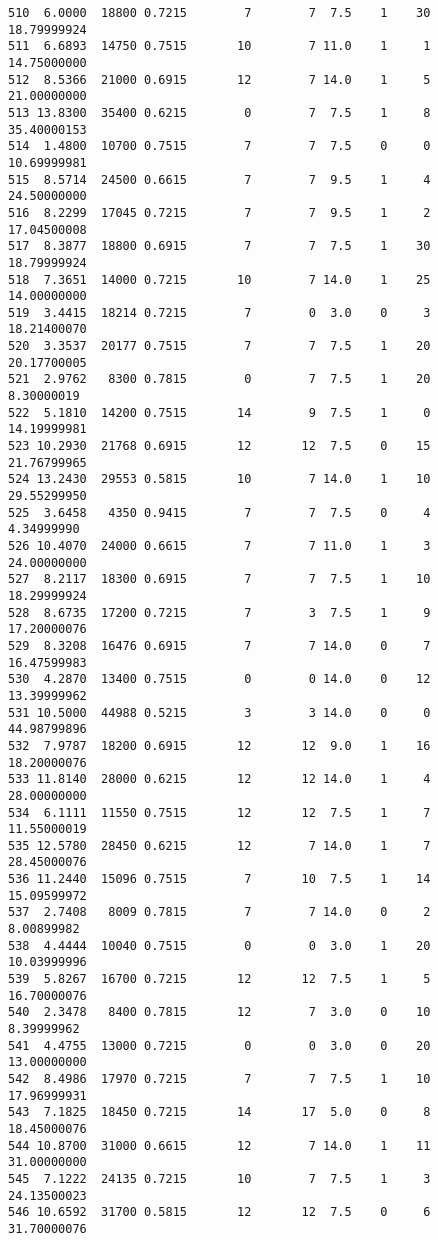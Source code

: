 \documentclass[
  letterpaper,
  DIV=11,
  numbers=noendperiod]{scrreprt}
\begin{document}
\begin{verbatim}
510  6.0000  18800 0.7215        7        7  7.5    1    30 18.79999924
511  6.6893  14750 0.7515       10        7 11.0    1     1 14.75000000
512  8.5366  21000 0.6915       12        7 14.0    1     5 21.00000000
513 13.8300  35400 0.6215        0        7  7.5    1     8 35.40000153
514  1.4800  10700 0.7515        7        7  7.5    0     0 10.69999981
515  8.5714  24500 0.6615        7        7  9.5    1     4 24.50000000
516  8.2299  17045 0.7215        7        7  9.5    1     2 17.04500008
517  8.3877  18800 0.6915        7        7  7.5    1    30 18.79999924
518  7.3651  14000 0.7215       10        7 14.0    1    25 14.00000000
519  3.4415  18214 0.7215        7        0  3.0    0     3 18.21400070
520  3.3537  20177 0.7515        7        7  7.5    1    20 20.17700005
521  2.9762   8300 0.7815        0        7  7.5    1    20  8.30000019
522  5.1810  14200 0.7515       14        9  7.5    1     0 14.19999981
523 10.2930  21768 0.6915       12       12  7.5    0    15 21.76799965
524 13.2430  29553 0.5815       10        7 14.0    1    10 29.55299950
525  3.6458   4350 0.9415        7        7  7.5    0     4  4.34999990
526 10.4070  24000 0.6615        7        7 11.0    1     3 24.00000000
527  8.2117  18300 0.6915        7        7  7.5    1    10 18.29999924
528  8.6735  17200 0.7215        7        3  7.5    1     9 17.20000076
529  8.3208  16476 0.6915        7        7 14.0    0     7 16.47599983
530  4.2870  13400 0.7515        0        0 14.0    0    12 13.39999962
531 10.5000  44988 0.5215        3        3 14.0    0     0 44.98799896
532  7.9787  18200 0.6915       12       12  9.0    1    16 18.20000076
533 11.8140  28000 0.6215       12       12 14.0    1     4 28.00000000
534  6.1111  11550 0.7515       12       12  7.5    1     7 11.55000019
535 12.5780  28450 0.6215       12        7 14.0    1     7 28.45000076
536 11.2440  15096 0.7515        7       10  7.5    1    14 15.09599972
537  2.7408   8009 0.7815        7        7 14.0    0     2  8.00899982
538  4.4444  10040 0.7515        0        0  3.0    1    20 10.03999996
539  5.8267  16700 0.7215       12       12  7.5    1     5 16.70000076
540  2.3478   8400 0.7815       12        7  3.0    0    10  8.39999962
541  4.4755  13000 0.7215        0        0  3.0    0    20 13.00000000
542  8.4986  17970 0.7215        7        7  7.5    1    10 17.96999931
543  7.1825  18450 0.7215       14       17  5.0    0     8 18.45000076
544 10.8700  31000 0.6615       12        7 14.0    1    11 31.00000000
545  7.1222  24135 0.7215       10        7  7.5    1     3 24.13500023
546 10.6592  31700 0.5815       12       12  7.5    0     6 31.70000076

\end{verbatim}
\end{document}
